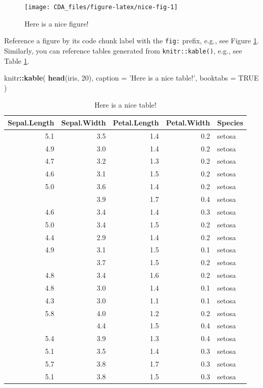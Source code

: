\documentclass[
]{book}
\newenvironment{Shaded}{\begin{snugshade}}{\end{snugshade}}
\newcommand{\DataTypeTok}[1]{\textcolor[rgb]{0.13,0.29,0.53}{#1}}
\newcommand{\DecValTok}[1]{\textcolor[rgb]{0.00,0.00,0.81}{#1}}
\newcommand{\KeywordTok}[1]{\textcolor[rgb]{0.13,0.29,0.53}{\textbf{#1}}}
\newcommand{\NormalTok}[1]{#1}
\newcommand{\OperatorTok}[1]{\textcolor[rgb]{0.81,0.36,0.00}{\textbf{#1}}}
\newcommand{\OtherTok}[1]{\textcolor[rgb]{0.56,0.35,0.01}{#1}}
\newcommand{\StringTok}[1]{\textcolor[rgb]{0.31,0.60,0.02}{#1}}
\begin{document}
\begin{figure}

{\centering \texttt{[image: CDA\_files/figure-latex/nice-fig-1]} 

}

\caption{Here is a nice figure!}\label{fig:nice-fig}
\end{figure}

Reference a figure by its code chunk label with the \texttt{fig:} prefix, e.g., see Figure \ref{fig:nice-fig}. Similarly, you can reference tables generated from \texttt{knitr::kable()}, e.g., see Table \ref{tab:nice-tab}.

\begin{Shaded}
\begin{Highlighting}[]
\NormalTok{knitr}\OperatorTok{::}\KeywordTok{kable}\NormalTok{(}
  \KeywordTok{head}\NormalTok{(iris, }\DecValTok{20}\NormalTok{), }\DataTypeTok{caption =} \StringTok{'Here is a nice table!'}\NormalTok{,}
  \DataTypeTok{booktabs =} \OtherTok{TRUE}
\NormalTok{)}
\end{Highlighting}
\end{Shaded}

\begin{table}

\caption{\label{tab:nice-tab}Here is a nice table!}
\centering
\begin{tabular}[t]{rrrrl}
\toprule
Sepal.Length & Sepal.Width & Petal.Length & Petal.Width & Species\\
\midrule
5.1 & 3.5 & 1.4 & 0.2 & setosa\\
4.9 & 3.0 & 1.4 & 0.2 & setosa\\
4.7 & 3.2 & 1.3 & 0.2 & setosa\\
4.6 & 3.1 & 1.5 & 0.2 & setosa\\
5.0 & 3.6 & 1.4 & 0.2 & setosa\\
\addlinespace
5.4 & 3.9 & 1.7 & 0.4 & setosa\\
4.6 & 3.4 & 1.4 & 0.3 & setosa\\
5.0 & 3.4 & 1.5 & 0.2 & setosa\\
4.4 & 2.9 & 1.4 & 0.2 & setosa\\
4.9 & 3.1 & 1.5 & 0.1 & setosa\\
\addlinespace
5.4 & 3.7 & 1.5 & 0.2 & setosa\\
4.8 & 3.4 & 1.6 & 0.2 & setosa\\
4.8 & 3.0 & 1.4 & 0.1 & setosa\\
4.3 & 3.0 & 1.1 & 0.1 & setosa\\
5.8 & 4.0 & 1.2 & 0.2 & setosa\\
\addlinespace
5.7 & 4.4 & 1.5 & 0.4 & setosa\\
5.4 & 3.9 & 1.3 & 0.4 & setosa\\
5.1 & 3.5 & 1.4 & 0.3 & setosa\\
5.7 & 3.8 & 1.7 & 0.3 & setosa\\
5.1 & 3.8 & 1.5 & 0.3 & setosa\\
\bottomrule
\end{tabular}
\end{table}
\end{document}
